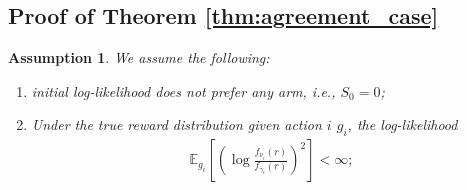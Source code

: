 \documentclass[12pt]{article}
\newtheorem{assumption}{Assumption}
\newcommand{\E}{\mathbb{E}}
\begin{document}
\subsection{Proof of Theorem \ref{thm:agreement_case}}
\label{app:D:agreement_proof}

\begin{assumption}
We assume the following: 
\begin{enumerate}
    \item initial log-likelihood does not prefer any arm, i.e., $S_0 = 0$;
    \item Under the true reward distribution given action $i$ $g_i$, the log-likelihood
    \begin{align*}
        \E_{g_i} \left[ \left( \log \frac{f_{\nu_i}(r)} {f_{\gamma_i}(r)} \right)^2 \right] < \infty;
    \end{align*}
\end{enumerate}\label{as:two-arm}
\end{assumption}
\end{document}
